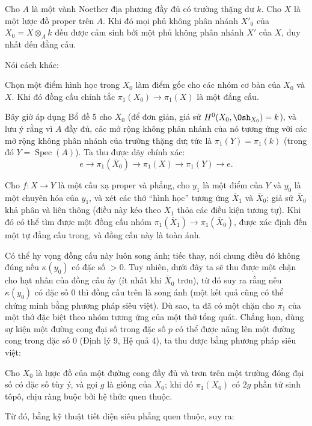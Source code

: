  Cho $A$ là một vành Noether địa phương đầy đủ có trường
thặng dư $k$. Cho $X$ là một lược đồ proper trên $A$. Khi đó mọi phủ không
phân nhánh $X'_0$ của $X_0=X\otimes_A k$ đều được cảm sinh bởi một phủ không
phân nhánh $X'$ của $X$, duy nhất đến đẳng cấu.

Nói cách khác:

 Chọn một điểm hình học trong $X_0$ làm điểm gốc cho các
nhóm cơ bản của $X_0$ và $X$. Khi đó đồng cấu chính tắc
$\pi_1(X_0)\longrightarrow\pi_1(X)$ là một đẳng cấu.

Bây giờ áp dụng Bổ đề 5 cho $X_0$ (để đơn giản, giả sử
$H^0(X_0,\Osh_{X_0})=k$), và lưu ý rằng vì $A$ đầy đủ, các mở rộng không phân
nhánh của nó tương ứng với các mở rộng không phân nhánh của trường thặng dư;
tức là $\pi_1(Y)=\pi_1(k)$ (trong đó $Y=\operatorname{Spec}(A)$). Ta thu được
dãy chính xác:
\[
  e\longrightarrow\pi_1(\overline X_0)
  \longrightarrow\pi_1(X)\longrightarrow\pi_1(Y)\longrightarrow e.
\]

 Cho $f:X\longrightarrow Y$ là một cấu xạ proper và phẳng,
cho $y_1$ là một điểm của $Y$ và $y_0$ là một chuyên hóa của $y_1$, và xét các
thớ “hình học” tương ứng $\overline X_1$ và $\overline X_0$; giả sử
$\overline X_0$ khả phân và liên thông (điều này kéo theo
$\overline X_1$ thỏa các điều kiện tương tự). Khi đó có thể tìm được một đồng
cấu nhóm
$\pi_1(\overline X_1)\longrightarrow\pi_1(\overline X_0)$, được xác định đến
một tự đẳng cấu trong, và đồng cấu này là toàn ánh.


Có thể hy vọng đồng cấu này luôn song ánh; tiếc thay, nói chung điều đó không
đúng nếu $\kappa(y_0)$ có đặc số $>0$. Tuy nhiên, dưới đây ta sẽ thu được một
chặn cho hạt nhân của đồng cấu ấy (ít nhất khi $\overline X_0$ trơn), từ đó suy
ra rằng nếu $\kappa(y_0)$ có đặc số $0$ thì đồng cấu trên là song ánh (một kết
quả cũng có thể chứng minh bằng phương pháp siêu việt). Dù sao, ta đã có một
chặn cho $\pi_1$ của một thớ đặc biệt theo nhóm tương ứng của một thớ tổng quát.
Chẳng hạn, dùng sự kiện một đường cong đại số trong đặc số $p$ có thể được nâng
lên một đường cong trong đặc số $0$ (Định lý 9, Hệ quả 4), ta thu được bằng
phương pháp siêu việt:

 Cho $X_0$ là lược đồ của một đường cong đầy đủ và trơn trên
một trường đóng đại số có đặc số tùy ý, và gọi $g$ là giống của $X_0$; khi đó
$\pi_1(X_0)$ có $2g$ phần tử sinh tôpô, chịu ràng buộc bởi hệ thức quen thuộc.

Từ đó, bằng kỹ thuật tiết diện siêu phẳng quen thuộc, suy ra:

